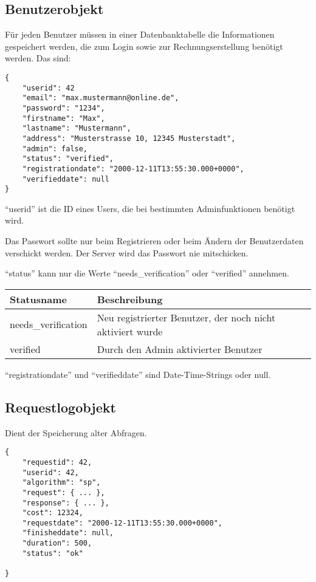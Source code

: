 \documentclass[ngerman,titlepage,parskip=true]{scrartcl}
\begin{document}
	\subsection{Benutzerobjekt}
	\label{benutzerobjekt}
	Für jeden Benutzer müssen in einer Datenbanktabelle die Informationen gespeichert werden, die zum Login sowie zur Rechnungserstellung benötigt werden. 	
	Das sind:
	
\begin{lstlisting}
{
	"userid": 42
	"email": "max.mustermann@online.de",
	"password": "1234",
	"firstname": "Max",
	"lastname": "Mustermann",
	"address": "Musterstrasse 10, 12345 Musterstadt",
	"admin": false,
	"status": "verified",
	"registrationdate": "2000-12-11T13:55:30.000+0000",
	"verifieddate": null
}
\end{lstlisting}
	
	``userid'' ist die ID eines Users, die bei bestimmten Adminfunktionen benötigt wird.
	
	Das Passwort sollte nur beim Registrieren oder beim Ändern der Benutzerdaten verschickt werden. Der Server wird das Passwort nie mitschicken.
	
	``status'' kann nur die Werte ``needs{\_}verification'' oder ``verified'' annehmen. 
	
	\begin{tabular}{|p{}|p{}|}
	\hline
	Statusname 	& Beschreibung \\\hline
	needs{\_}verification 	& Neu registrierter Benutzer, der noch nicht aktiviert wurde\\
	verified 				& Durch den Admin aktivierter Benutzer \\
	\hline
	\end{tabular}	
	
	
	``registrationdate'' und ``verifieddate'' sind Date-Time-Strings oder null. 
	
	\subsection{Requestlogobjekt}	
	Dient der Speicherung alter Abfragen.
	\label{requestlogobjekt}

\begin{lstlisting}
{
	"requestid": 42,
	"userid": 42,
	"algorithm": "sp",
	"request": { ... },
	"response": { ... },
	"cost": 12324,
	"requestdate": "2000-12-11T13:55:30.000+0000",
	"finisheddate": null,
	"duration": 500,
	"status": "ok"
	
}
\end{lstlisting}
\end{document}
